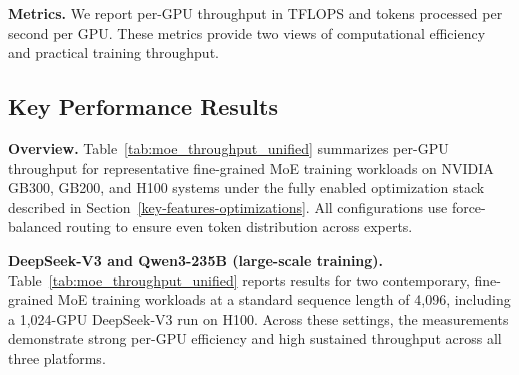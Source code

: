 \documentclass[10pt,logo,copyright]{nvidiatechreport}
\begin{document}
\textbf{Metrics.}
We report per-GPU throughput in TFLOPS and tokens processed per second per GPU. These metrics provide two views of computational efficiency and practical training throughput.

\subsection{Key Performance Results}


\textbf{Overview.}
Table~\ref{tab:moe_throughput_unified} summarizes per-GPU throughput for representative fine-grained MoE training workloads on NVIDIA GB300, GB200, and H100 systems under the fully enabled optimization stack described in Section~\ref{key-features-optimizations}. All configurations use force-balanced routing to ensure even token distribution across experts.


\textbf{DeepSeek-V3 and Qwen3-235B (large-scale training).}
Table~\ref{tab:moe_throughput_unified} reports results for two contemporary, fine-grained MoE training workloads at a standard sequence length of 4{,}096, including a 1{,}024-GPU DeepSeek-V3 run on H100. Across these settings, the measurements demonstrate strong per-GPU efficiency and high sustained throughput across all three platforms.
\end{document}
